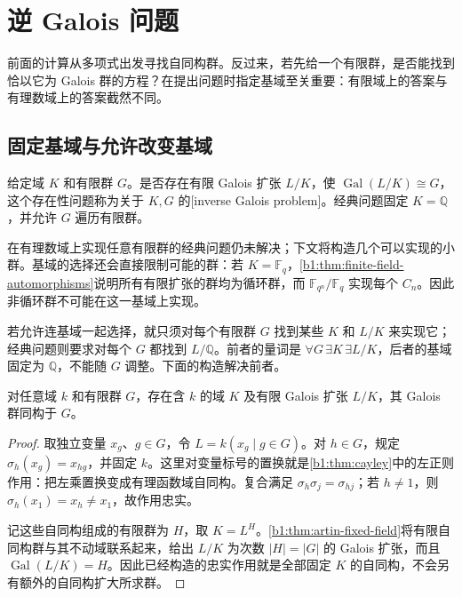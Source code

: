 
\section{逆 Galois 问题}
\label{b1:sec:D02}

前面的计算从多项式出发寻找自同构群。反过来，若先给一个有限群，是否能找到恰以它为 Galois 群的方程？在提出问题时指定基域至关重要：有限域上的答案与有理数域上的答案截然不同。

\subsection{固定基域与允许改变基域}
\label{b1:subsec:D02:01}

\begin{definition}\label{b1:def:inverse-galois}
	给定域 \(K\) 和有限群 \(G\)。是否存在有限 Galois 扩张 \(L/K\)，使 \(\operatorname{Gal}(L/K)\cong G\)，这个存在性问题称为关于 \(K,G\) 的[inverse Galois problem]。经典问题固定 \(K=\mathbb Q\)，并允许 \(G\) 遍历有限群。
\end{definition}

在有理数域上实现任意有限群的经典问题仍未解决；下文将构造几个可以实现的小群。基域的选择还会直接限制可能的群：若 \(K=\mathbb F_q\)，\cref{b1:thm:finite-field-automorphisms}说明所有有限扩张的群均为循环群，而 \(\mathbb F_{q^n}/\mathbb F_q\) 实现每个 \(C_n\)。因此非循环群不可能在这一基域上实现。

\ProseParagraphBreak
若允许连基域一起选择，就只须对每个有限群 \(G\) 找到某些 \(K\) 和 \(L/K\) 来实现它；经典问题则要求对每个 \(G\) 都找到 \(L/\mathbb Q\)。前者的量词是 \(\forall G\,\exists K\,\exists L/K\)，后者的基域固定为 \(\mathbb Q\)，不能随 \(G\) 调整。下面的构造解决前者。

\begin{proposition}\label{b1:prop:finite-group-realization}
	对任意域 \(k\) 和有限群 \(G\)，存在含 \(k\) 的域 \(K\) 及有限 Galois 扩张 \(L/K\)，其 Galois 群同构于 \(G\)。
\end{proposition}

\begin{proof}
	取独立变量 \(x_g\)、\(g\in G\)，令 \(L=k(x_g\mid g\in G)\)。对 \(h\in G\)，规定 \(\sigma_h(x_g)=x_{hg}\)，并固定 \(k\)。这里对变量标号的置换就是\cref{b1:thm:cayley}中的左正则作用：把左乘置换变成有理函数域自同构。复合满足 \(\sigma_h\sigma_j=\sigma_{hj}\)；若 \(h\neq1\)，则 \(\sigma_h(x_1)=x_h\neq x_1\)，故作用忠实。

	记这些自同构组成的有限群为 \(H\)，取 \(K=L^H\)。\cref{b1:thm:artin-fixed-field}将有限自同构群与其不动域联系起来，给出 \(L/K\) 为次数 \(|H|=|G|\) 的 Galois 扩张，而且 \(\operatorname{Gal}(L/K)=H\)。因此已经构造的忠实作用就是全部固定 \(K\) 的自同构，不会另有额外的自同构扩大所求群。
\end{proof}

